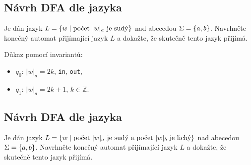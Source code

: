 \subsection{Návrh DFA dle jazyka}

Je dán jazyk $L = \left\lbrace w \mid \text{počet } |w|_a \text{ je sudý} \right\rbrace$ nad abecedou $\Sigma = \left\lbrace a,b \right\rbrace$. Navrhněte konečný
automat přijímající jazyk $L$ a dokažte, že skutečně tento jazyk přijímá.

\begin{multicols}{2}

    Důkaz pomocí invariantů:
    \begin{itemize}[noitemsep]
        \item $q_0$: $|w|_a = 2k$, \texttt{in}, \texttt{out},
        \item $q_1$: $|w|_a = 2k + 1$, $k \in \mathbb{Z}$.
    \end{itemize}
\end{multicols}

\subsection{Návrh DFA dle jazyka}
Je dán jazyk $L = \left\lbrace w \mid \text{počet } |w|_a \text{ je sudý a počet } |w|_b \text{ je lichý} \right\rbrace$ nad abecedou
$\Sigma = \left\lbrace a,b \right\rbrace$. Navrhněte konečný automat přijímající jazyk $L$ a dokažte, že skutečně tento jazyk přijímá.

